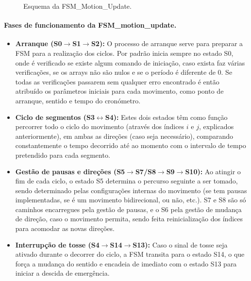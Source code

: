 \begin{figure}[p]
{}
  \caption{Esquema da FSM\_Motion\_Update.}
  \label{fig:fsm-motion}
\end{figure}

\clearpage

\paragraph{Fases de funcionamento da FSM\_motion\_update.}
\begin{itemize}
  \item \textbf{Arranque (S0$\to$S1$\to$S2):} O processo de arranque serve para preparar a FSM para a realização dos ciclos. Por padrão inicia sempre no estado S0, onde é verificado se existe algum comando de iniciação, caso exista faz várias verificações, se os arrays não são nulos e se o período é diferente de 0. Se todas as verificações passarem sem qualquer erro encontrado é então atribuído os parâmetros iniciais para cada movimento, como ponto de arranque, sentido e tempo do cronómetro.

  \item \textbf{Ciclo de segmentos (S3$\leftrightarrow$S4):} Estes dois estados têm como função percorrer todo o ciclo do movimento (através dos índices \(i\) e \(j\), explicados anteriormente), em ambas as direções (caso seja necessário), comparando constantemente o tempo decorrido até ao momento com o intervalo de tempo pretendido para cada segmento.

  \item \textbf{Gestão de pausas e direções (S5$\to$S7/S8$\to$S9$\to$S10):} Ao atingir o fim de cada ciclo, o estado S5 determina o percurso seguinte a ser tomado, sendo determinado pelas configurações internas do movimento (se tem pausas implementadas, se é um movimento bidirecional, ou não, etc.). S7 e S8 são só caminhos encarregues pela gestão de pausas, e o S6 pela gestão de mudança de direção, caso o movimento permita, sendo feita reinicialização dos índices para acomodar as novas direções.

  \item \textbf{Interrupção de tosse (S4$\to$S14$\to$S13):} Caso o sinal de tosse seja ativado durante o decorrer do ciclo, a FSM transita para o estado S14, o que força a mudança do sentido e encadeia de imediato com o estado S13 para iniciar a descida de emergência.
\end{itemize}

